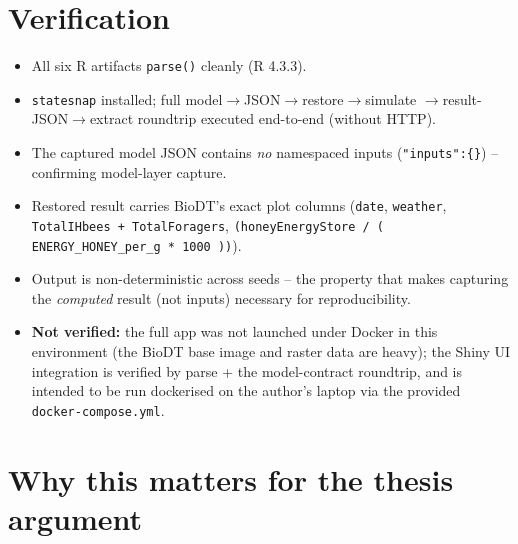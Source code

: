 \documentclass[12pt,a4paper]{article}
\begin{document}
\section{Verification}

\begin{itemize}[nosep]
  \item All six R artifacts \texttt{parse()} cleanly (R 4.3.3).
  \item \texttt{statesnap} installed; full model$\to$JSON$\to$restore$\to$simulate
    $\to$result-JSON$\to$extract roundtrip executed end-to-end (without HTTP).
  \item The captured model JSON contains \emph{no} namespaced inputs
    (\texttt{"inputs":\{\}}) -- confirming model-layer capture.
  \item Restored result carries BioDT's exact plot columns
    (\texttt{date}, \texttt{weather}, \texttt{TotalIHbees + TotalForagers},
    \texttt{(honeyEnergyStore / ( ENERGY\_HONEY\_per\_g * 1000 ))}).
  \item Output is non-deterministic across seeds -- the property that makes
    capturing the \emph{computed} result (not inputs) necessary for
    reproducibility.
  \item \textbf{Not verified:} the full app was not launched under Docker in this
    environment (the BioDT base image and raster data are heavy); the Shiny UI
    integration is verified by parse + the model-contract roundtrip, and is
    intended to be run dockerised on the author's laptop via the provided
    \texttt{docker-compose.yml}.
\end{itemize}

\section{Why this matters for the thesis argument}
\end{document}
